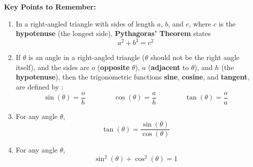 \documentclass{article}
\begin{document}
{\bf Key Points to Remember:}

\vspace{5mm}

\begin{enumerate}
\item In a right-angled triangle with sides of length $a$, $b$, and $c$, where $c$ is the {\bf hypotenuse} (the longest side), {\bf Pythagoras' Theorem} states
\[a^2+b^2=c^2\]
\item If $\theta$ is an angle in a right-angled triangle ($\theta$ should not be the right angle itself), and the sides are $o$ ({\bf opposite} $\theta$), $a$ ({\bf adjacent} to $\theta$), and $h$ (the {\bf hypotenuse}), then the trigonometric functions {\bf sine}, {\bf cosine}, and {\bf tangent}, are defined by :
\[\sin(\theta)=\frac{o}{h}\qquad\qquad \cos(\theta)=\frac{a}{h}\qquad\qquad \tan(\theta) = \frac{o}{a}\]
\item For any angle $\theta$,
\[\tan(\theta)=\frac{\sin(\theta)}{\cos(\theta)}\]
\item For any angle $\theta$,
\[\sin^2(\theta)+\cos^2(\theta)=1\]
\end{enumerate}
\end{document}
